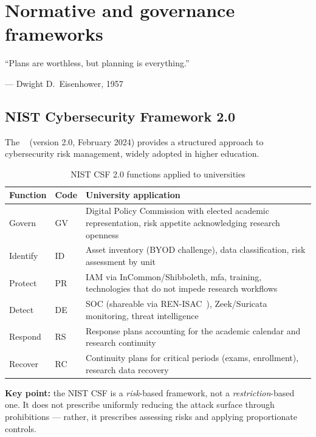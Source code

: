 \section{Normative and governance frameworks}
\label{sec:normes}

\epigraph{``Plans are worthless, but planning is everything.''}{--- Dwight D.\ Eisenhower, 1957~\cite{eisenhower1957}}

\subsection{NIST Cybersecurity Framework 2.0}

The ~\cite{nist-csf} (version 2.0,
February 2024) provides a structured approach to cybersecurity risk
management, widely adopted in higher education.

\begin{table}[H]
\centering
\caption{NIST CSF 2.0 functions applied to universities}
\label{tab:nist-csf}
\small
\begin{tabularx}{\textwidth}{l l X}
\toprule
\textbf{Function} & \textbf{Code} & \textbf{University application} \\
\midrule
Govern & GV & Digital Policy Commission with elected academic
    representation, risk appetite acknowledging research openness \\
\addlinespace
Identify & ID & Asset inventory (BYOD challenge), data classification,
    risk assessment by unit \\
\addlinespace
Protect & PR & IAM via InCommon/Shibboleth, \gls{mfa}, training, technologies
    that do not impede research workflows \\
\addlinespace
Detect & DE & SOC (shareable via REN-ISAC~\cite{ren-isac}),
    Zeek/Suricata monitoring, threat intelligence \\
\addlinespace
Respond & RS & Response plans accounting for the academic calendar
    and research continuity \\
\addlinespace
Recover & RC & Continuity plans for critical periods
    (exams, enrollment), research data recovery \\
\bottomrule
\end{tabularx}
\end{table}

\textbf{Key point:} the NIST CSF is a \emph{risk}-based framework,
not a \emph{restriction}-based one. It does not prescribe uniformly
reducing the attack surface through prohibitions --- rather, it prescribes
assessing risks and applying proportionate controls.

